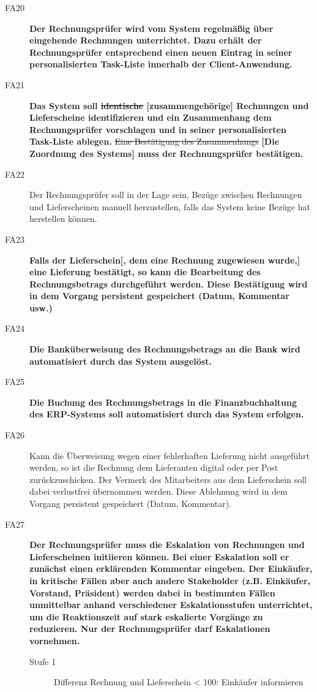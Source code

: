 \begin{description}
  \item[FA20] \textbf{Der Rechnungsprüfer wird vom System regelmäßig über eingehende Rechnungen unterrichtet. Dazu erhält der Rechnungsprüfer entsprechend einen neuen Eintrag in seiner personalisierten Task-Liste innerhalb der Client-Anwendung.}
  \item[FA21] \textbf{Das System soll \sout{identische} [zusammengehörige] Rechnungen und Lieferscheine identifizieren und ein Zusammenhang dem Rechnungsprüfer vorschlagen und in seiner personalisierten Task-­Liste ablegen.} \sout{Eine Bestätigung des Zusammenhangs} \textbf{[Die Zuordnung des Systems] muss der Rechnungsprüfer bestätigen.}
  \item[FA22] Der Rechnungsprüfer soll in der Lage sein, Bezüge zwischen Rechnungen und Lieferscheinen manuell herzustellen, falls das System keine Bezüge hat herstellen können.
  \item[FA23] \textbf{Falls der Lieferschein[, dem eine Rechnung zugewiesen wurde,] eine Lieferung bestätigt, so kann die Bearbeitung des Rechnungsbetrags durchgeführt werden. Diese Bestätigung wird in dem Vorgang persistent gespeichert (Datum, Kommentar usw.)}
  \item[FA24] \textbf{Die Banküberweisung des Rechnungsbetrags an die Bank wird automatisiert durch das System ausgelöst.}
  \item[FA25] \textbf{Die Buchung des Rechnungsbetrags in die Finanzbuchhaltung des ERP-­Systems soll automatisiert durch das System erfolgen.}
  \item[FA26] Kann die Überweisung wegen einer fehlerhaften Lieferung nicht ausgeführt werden, so ist die Rechnung dem Lieferanten digital oder per Post zurückzuschicken. Der Vermerk des Mitarbeiters aus dem Lieferschein soll dabei verlustfrei übernommen werden. Diese Ablehnung wird in dem Vorgang persistent gespeichert (Datum, Kommentar).
  \item[FA27] \textbf{Der Rechnungsprüfer muss die Eskalation von Rechnungen und Lieferscheinen initiieren können. Bei einer Eskalation soll er zunächst einen erklärenden Kommentar eingeben. Der Einkäufer, in kritische Fällen aber auch andere Stakeholder (z.B. Einkäufer, Vorstand, Präsident) werden dabei in bestimmten Fällen unmittelbar anhand verschiedener Eskalationsstufen unterrichtet, um die Reaktionszeit auf stark eskalierte Vorgänge zu reduzieren. Nur der Rechnungsprüfer darf Eskalationen vornehmen.}
  \begin{description}
    \item[Stufe 1] Differenz Rechnung und Lieferschein < 100: Einkäufer informieren

\end{description}
\end{description}
